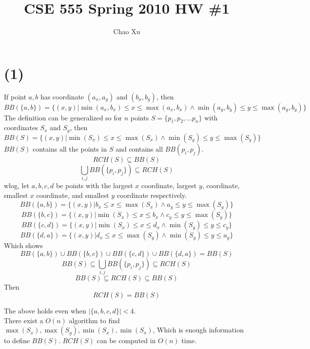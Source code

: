 \documentclass[letter]{article}
\title{CSE 555 Spring 2010 HW \#1}
\date{}
\author{Chao Xu}
\begin{document}
\maketitle
\vspace{-.5in}
\section*{(1)}
If point $a,b$ has coordinate $(a_x,a_y)$ and $(b_x,b_y)$, then \[
 BB(\{a,b\})
= \{(x,y)| \min(a_x,b_x) \leq x\leq \max(a_x,b_x) \wedge \min(a_y,b_y) \leq
y\leq
\max(a_y,b_y)\}     
                                                                \]
The definition can be generalized so for $n$ points $S = \{p_1,p_2,\ldots p_n\}$
with
coordinates $S_x$ and $S_y$, then 
\[
 BB(S)
= \{(x,y)| \min(S_x) \leq x\leq \max(S_x) \wedge \min(S_y) \leq
y\leq \max(S_y)\}      
                                                              \]
$BB(S)$ contains all the points in $S$ and contains
all $BB({p_i,p_j})$.
\[
RCH(S)\subseteq BB(S)
\]
\[
\bigcup_{i,j} BB(\{p_i,p_j\}) \subseteq RCH(S)
\]
wlog, let $a, b, c, d$ be points
with the largest $x$ coordinate, largest $y$, coordinate, smallest $x$
coordinate, and smallest $y$ coordinate respectively.\\
\[
BB(\{a,b\}) = \{(x,y)| b_x \leq x\leq \max(S_x) \wedge a_y \leq y\leq
\max(S_y)\}
\]
\[
BB(\{b,c\}) = \{(x,y)| \min(S_x) \leq x\leq b_x \wedge c_y \leq y\leq
\max(S_y)\}
\]
\[
BB(\{c,d\}) = \{(x,y)| \min(S_x) \leq x\leq d_x \wedge \min(S_y) \leq y\leq
c_y\}
\]
\[
BB(\{d,a\}) = \{(x,y)| d_x \leq x\leq \max(S_y) \wedge \min(S_y) \leq y\leq
a_y\}
\]
Which shows 
\[BB(\{a, b\})\cup BB(\{b, c\}) \cup BB(\{c, d\}) \cup BB(\{d,a\})= BB(S)\]
\[BB(S) \subseteq \bigcup_{i,j} BB(\{p_i,p_j\}) \subseteq RCH(S)\]
\[BB(S) \subseteq RCH(S) \subseteq BB(S)\]
Then \[RCH(S) = BB(S)\]

The above holds even when $|\{a,b,c,d\}|< 4$.\\
There exist a $O(n)$ algorithm to find
$\max(S_x),\max(S_y),\min(S_x),\min(S_x)$, 
Which is enough information to define $BB(S)$. $RCH(S)$ can be computed in
$O(n)$ time.
\end{document}
